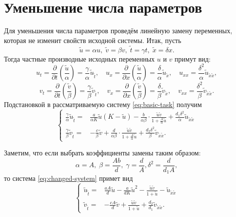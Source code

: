 \documentclass[a4paper, 11pt]{article}
\begin{document}
	\section{Уменьшение числа параметров}
	Для уменьшения числа параметров проведём линейную замену переменных, которая не изменит свойств исходной системы. Итак, пусть
	$$
		\tilde u = \alpha u, \;
		\tilde v = \beta v,  \;
		\tilde t = \gamma t, \;
		\tilde x = \delta x.
	$$
	Тогда частные производные исходных переменных $u$ и $v$ примут вид:
	$$
		u_t = \frac{\partial}{\partial t} \left(\frac{\tilde u}{\alpha}\right) =
		\frac{\gamma}{\alpha}\tilde u_{\tilde t},
		\quad
		u_x = \frac{\partial}{\partial x} \left(\frac{\tilde u}{\alpha}\right) =
		\frac{\delta}{\alpha}\tilde u_{\tilde x},
		\quad
		u_{xx} = \frac{\delta^2}{\alpha}\tilde u_{\tilde x \tilde x},
	$$
	$$
		v_t = \frac{\partial}{\partial t} \left(\frac{\tilde v}{\beta}\right) =
		\frac{\gamma}{\beta}\tilde v_{\tilde t},
		\quad
		v_x = \frac{\partial}{\partial x} \left(\frac{\tilde v}{\beta}\right) =
		\frac{\delta}{\beta}\tilde v_{\tilde x},
		\quad
		v_{xx} = \frac{\delta^2}{\beta}\tilde v_{\tilde x \tilde x}.
	$$
	Подстановкой в рассматриваемую систему \eqref{eq:basic-task} получим
	\begin{equation}\label{eq:changed-system}
		\left\{\begin{aligned}
			\frac{\gamma}{\alpha} \tilde u_{\tilde t} =&
			\frac{a}{\alpha K}\tilde u(K - \tilde u) -
			\frac{b}{\alpha\beta}\cdot\frac{\tilde u \tilde v}{1 + \frac{A}{\alpha}\tilde u} +
			\frac{d_1 \delta^2}{\alpha} \tilde u_{\tilde x \tilde x}\\
			\frac{\gamma}{\beta} \tilde v_{\tilde t} =&
			-\frac{c}{\beta} \tilde v +
			\frac{d}{\alpha\beta}\cdot\frac{\tilde u \tilde v}{1 + \frac{A}{\alpha}\tilde u} +
			\frac{d_2 \delta^2}{\beta} \tilde v_{\tilde x \tilde x}.
		\end{aligned}\right.
	\end{equation}

	Заметим, что если выбрать коэффициенты замены таким образом:
	$$
		\alpha = A,\; \beta = \frac{Ab}{d},\;
		\gamma = \frac{d}{A}, \delta^2 = \frac{d}{d_1 A},
	$$
	то система \eqref{eq:changed-system} примет вид
	\begin{equation}
		\left\{\begin{aligned}
		\tilde u_{\tilde t} =& \frac{aA}{d} \tilde u -
		\frac{a}{dK} \tilde u^2 -
		\frac{\tilde u \tilde v}{1 + \tilde u} -
		\tilde u_{\tilde x \tilde x}
		\\
		\tilde v_{\tilde t} =& - \frac{cA}{d}\tilde v +
		\frac{\tilde u \tilde v}{1 + \tilde u} +
		\frac{d_2}{d_1} \tilde v_{\tilde x \tilde x}.
		\end{aligned}\right.
	\end{equation}
\end{document}
